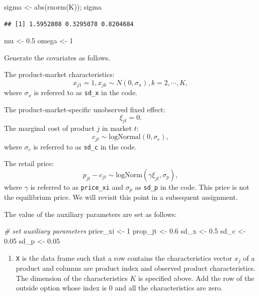 \documentclass[
]{book}
\newenvironment{Shaded}{\begin{snugshade}}{\end{snugshade}}
\newcommand{\CommentTok}[1]{\textcolor[rgb]{0.56,0.35,0.01}{\textit{#1}}}
\newcommand{\DecValTok}[1]{\textcolor[rgb]{0.00,0.00,0.81}{#1}}
\newcommand{\FloatTok}[1]{\textcolor[rgb]{0.00,0.00,0.81}{#1}}
\newcommand{\FunctionTok}[1]{\textcolor[rgb]{0.00,0.00,0.00}{#1}}
\newcommand{\NormalTok}[1]{#1}
\newcommand{\OtherTok}[1]{\textcolor[rgb]{0.56,0.35,0.01}{#1}}
\providecommand{\tightlist}{%
  \setlength{\itemsep}{0pt}\setlength{\parskip}{0pt}}
\begin{document}
\begin{Shaded}
\begin{Highlighting}[]
\NormalTok{sigma }\OtherTok{\textless{}{-}} \FunctionTok{abs}\NormalTok{(}\FunctionTok{rnorm}\NormalTok{(K)); sigma}
\end{Highlighting}
\end{Shaded}

\begin{verbatim}
## [1] 1.5952808 0.3295078 0.8204684
\end{verbatim}

\begin{Shaded}
\begin{Highlighting}[]
\NormalTok{mu }\OtherTok{\textless{}{-}} \FloatTok{0.5}
\NormalTok{omega }\OtherTok{\textless{}{-}} \DecValTok{1}
\end{Highlighting}
\end{Shaded}

Generate the covariates as follows.

The product-market characteristics:
\[
x_{j1} = 1, x_{jk} \sim N(0, \sigma_x), k = 2, \cdots, K,
\]
where \(\sigma_x\) is referred to as \texttt{sd\_x} in the code.

The product-market-specific unobserved fixed effect:
\[
\xi_{jt} = 0.
\]
The marginal cost of product \(j\) in market \(t\):
\[
c_{jt} \sim \text{logNormal}(0, \sigma_c),
\]
where \(\sigma_c\) is referred to as \texttt{sd\_c} in the code.

The retail price:
\[
p_{jt} - c_{jt} \sim \text{logNorm}(\gamma \xi_{jt}, \sigma_p),
\]
where \(\gamma\) is referred to as \texttt{price\_xi} and \(\sigma_p\) as \texttt{sd\_p} in the code. This price is not the equilibrium price. We will revisit this point in a subsequent assignment.

The value of the auxiliary parameters are set as follows:

\begin{Shaded}
\begin{Highlighting}[]
\CommentTok{\# set auxiliary parameters}
\NormalTok{price\_xi }\OtherTok{\textless{}{-}} \DecValTok{1}
\NormalTok{prop\_jt }\OtherTok{\textless{}{-}} \FloatTok{0.6}
\NormalTok{sd\_x }\OtherTok{\textless{}{-}} \FloatTok{0.5}
\NormalTok{sd\_c }\OtherTok{\textless{}{-}} \FloatTok{0.05}
\NormalTok{sd\_p }\OtherTok{\textless{}{-}} \FloatTok{0.05}
\end{Highlighting}
\end{Shaded}

\begin{enumerate}
\def\labelenumi{\arabic{enumi}.}
\setcounter{enumi}{1}
\tightlist
\item
  \texttt{X} is the data frame such that a row contains the characteristics vector \(x_{j}\) of a product and columns are product index and observed product characteristics. The dimension of the characteristics \(K\) is specified above. Add the row of the outside option whose index is \(0\) and all the characteristics are zero.
\end{enumerate}
\end{document}
